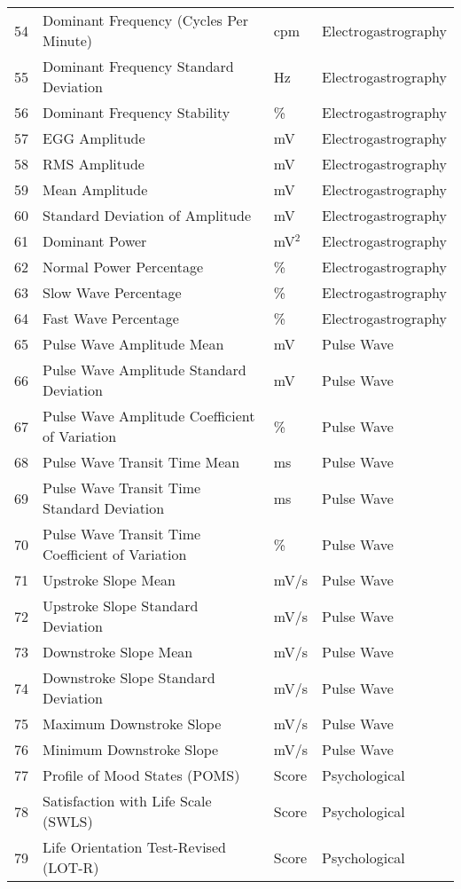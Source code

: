 \documentclass[11pt]{article}
\begin{document}
\begin{longtable}{p{1cm}p{7cm}p{3cm}p{4cm}}
54 & Dominant Frequency (Cycles Per Minute) & cpm & Electrogastrography \\
55 & Dominant Frequency Standard Deviation & Hz & Electrogastrography \\
56 & Dominant Frequency Stability & \% & Electrogastrography \\
57 & EGG Amplitude & mV & Electrogastrography \\
58 & RMS Amplitude & mV & Electrogastrography \\
59 & Mean Amplitude & mV & Electrogastrography \\
60 & Standard Deviation of Amplitude & mV & Electrogastrography \\
61 & Dominant Power & mV$^2$ & Electrogastrography \\
62 & Normal Power Percentage & \% & Electrogastrography \\
63 & Slow Wave Percentage & \% & Electrogastrography \\
64 & Fast Wave Percentage & \% & Electrogastrography \\
65 & Pulse Wave Amplitude Mean & mV & Pulse Wave \\
66 & Pulse Wave Amplitude Standard Deviation & mV & Pulse Wave \\
67 & Pulse Wave Amplitude Coefficient of Variation & \% & Pulse Wave \\
68 & Pulse Wave Transit Time Mean & ms & Pulse Wave \\
69 & Pulse Wave Transit Time Standard Deviation & ms & Pulse Wave \\
70 & Pulse Wave Transit Time Coefficient of Variation & \% & Pulse Wave \\
71 & Upstroke Slope Mean & mV/s & Pulse Wave \\
72 & Upstroke Slope Standard Deviation & mV/s & Pulse Wave \\
73 & Downstroke Slope Mean & mV/s & Pulse Wave \\
74 & Downstroke Slope Standard Deviation & mV/s & Pulse Wave \\
75 & Maximum Downstroke Slope & mV/s & Pulse Wave \\
76 & Minimum Downstroke Slope & mV/s & Pulse Wave \\
77 & Profile of Mood States (POMS) & Score & Psychological \\
78 & Satisfaction with Life Scale (SWLS) & Score & Psychological \\
79 & Life Orientation Test-Revised (LOT-R) & Score & Psychological \\

\end{longtable}
\end{document}
